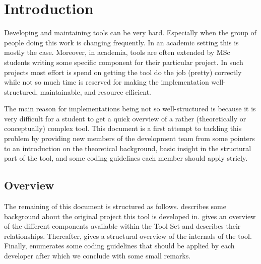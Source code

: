 \chapter{Introduction}

Developing and maintaining tools can be very hard. Especially when the group of people doing this work is changing frequently. In an academic setting this is mostly the case. Moreover, in academia, tools are often extended by MSc students writing some specific component for their particular project. In such projects most effort is spend on getting the tool do the job (pretty) correctly while not so much time is reserved for making the implementation well-structured, maintainable, and resource efficient.

The main reason for implementations being not so well-structured is because it is very difficult for a student to get a quick overview of a rather (theoretically or conceptually) complex tool. This document is a first attempt to tackling this problem by providing new members of the development team from some pointers to an introduction on the theoretical background, basic insight in the structural part of the tool, and some coding guidelines each member should apply stricly.

\section{Overview}

The remaining of this document is structured as follows.  describes some background about the original project this tool is developed in.  gives an overview of the different components available within the \GROOVE Tool Set and describes their relationships. Thereafter,  gives a structural overview of the internals of the tool. %
Finally,  enumerates some coding guidelines that should be applied by each developer after which we conclude with some small remarks.
